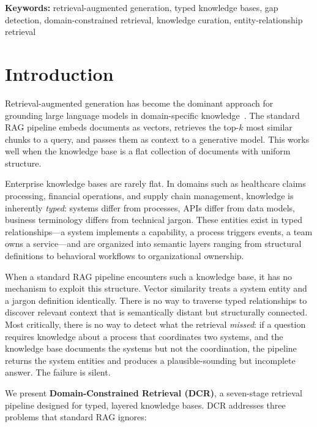 \documentclass[11pt,a4paper]{article}
\begin{document}
\noindent\textbf{Keywords:} retrieval-augmented generation, typed knowledge bases, gap detection, domain-constrained retrieval, knowledge curation, entity-relationship retrieval

\vspace{1em}

\section{Introduction}
\label{sec:introduction}

Retrieval-augmented generation has become the dominant approach for grounding large language models in domain-specific knowledge~\citep{lewis2020rag}. The standard RAG pipeline embeds documents as vectors, retrieves the top-$k$ most similar chunks to a query, and passes them as context to a generative model. This works well when the knowledge base is a flat collection of documents with uniform structure.

Enterprise knowledge bases are rarely flat. In domains such as healthcare claims processing, financial operations, and supply chain management, knowledge is inherently \emph{typed}: systems differ from processes, APIs differ from data models, business terminology differs from technical jargon. These entities exist in typed relationships---a system implements a capability, a process triggers events, a team owns a service---and are organized into semantic layers ranging from structural definitions to behavioral workflows to organizational ownership.

When a standard RAG pipeline encounters such a knowledge base, it has no mechanism to exploit this structure. Vector similarity treats a system entity and a jargon definition identically. There is no way to traverse typed relationships to discover relevant context that is semantically distant but structurally connected. Most critically, there is no way to detect what the retrieval \emph{missed}: if a question requires knowledge about a process that coordinates two systems, and the knowledge base documents the systems but not the coordination, the pipeline returns the system entities and produces a plausible-sounding but incomplete answer. The failure is silent.

We present \textbf{Domain-Constrained Retrieval (DCR)}, a seven-stage retrieval pipeline designed for typed, layered knowledge bases. DCR addresses three problems that standard RAG ignores:
\end{document}
